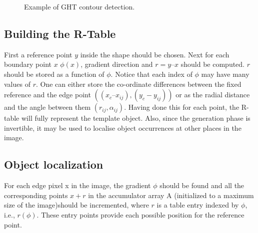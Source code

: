\documentclass[letterpaper,12pt]{article}
\begin{document}
\begin{figure}[h]
  \centering
  \hfill
  \caption{Example of GHT contour detection.}
\end{figure}

\subsection{Building the R-Table}

First a reference point $y$ inside the shape should be chosen. Next for each boundary point $x$ $\phi(x)$, gradient direction and $r = y – x$ should be computed. $r$ should be stored as a function of $\phi$. Notice that each index of $\phi$ may have many values of $r$. One can either store the co-ordinate differences between the fixed reference and the edge point $((x_c – x_{ij}),( y_c - y_{ij}))$ or as the radial distance and the angle between them $(r_{ij} , \alpha_{ij})$. Having done this for each point, the R-table will fully represent the template object. Also, since the generation phase is invertible, it may be used to localise object occurrences at other places in the image.


\subsection{Object localization}

For each edge pixel x in the image, the gradient $\phi$  should be found and all the corresponding points $x+r$ in the accumulator array A (initialized to a maximum size of the image)should be incremented, where $r$ is a table entry indexed by $\phi$, i.e., $r(\phi)$. These entry points provide each possible position for the reference point. 
\end{document}

